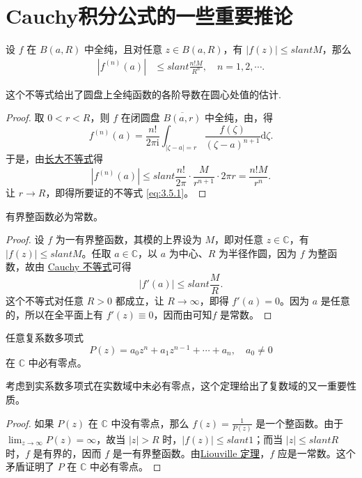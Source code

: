\documentclass[../../main.tex]{subfiles}
\begin{document}
\section{Cauchy积分公式的一些重要推论}

\begin{theorem}[Cauchy不等式]\label{theorem:Cauchy不等式-复变函数}
设 \( f \) 在 \( B(a,R) \) 中全纯，且对任意 \( z \in B(a,R) \)，有 \( |f(z)| \leqslant slant M \)，那么
\begin{align}
|f^{(n)}(a)| &\leqslant slant \frac{n!M}{R^n}, \quad n = 1,2,\cdots. \label{eq:3.5.1}
\end{align}
\end{theorem}
\begin{note}
这个不等式给出了圆盘上全纯函数的各阶导数在圆心处值的估计.
\end{note}
\begin{proof}
取 \( 0 < r < R \)，则 \( f \) 在闭圆盘 \( \overline{B(a,r)} \) 中全纯，由，得
\[
f^{(n)}(a) = \frac{n!}{2\pi \mathrm{i}} \int_{|\zeta - a| = r} \frac{f(\zeta)}{(\zeta - a)^{n + 1}} \mathrm{d}\zeta.
\]
于是，由\hyperref[proposition:长大不等式]{长大不等式}得
\[
|f^{(n)}(a)| \leqslant slant \frac{n!}{2\pi} \cdot \frac{M}{r^{n + 1}} \cdot 2\pi r = \frac{n!M}{r^n}.
\]
让 \( r \to R \)，即得所要证的不等式 \eqref{eq:3.5.1}。
\end{proof}

\begin{theorem}[Liouville定理]\label{theorem:Liouville(刘维尔)定理}
有界整函数必为常数。
\end{theorem}
\begin{proof}
设 \( f \) 为一有界整函数，其模的上界设为 \( M \)，即对任意 \( z \in \mathbb{C} \)，有 \( |f(z)| \leqslant slant M \)。任取 \( a \in \mathbb{C} \)，以 \( a \) 为中心、\( R \) 为半径作圆，因为 \( f \) 为整函数，故由 \hyperref[theorem:Cauchy不等式-复变函数]{Cauchy 不等式}可得
\[
|f'(a)| \leqslant slant \frac{M}{R}.
\]
这个不等式对任意 \( R > 0 \) 都成立，让 \( R \to \infty \)，即得 \( f'(a) = 0 \)。因为 \( a \) 是任意的，所以在全平面上有 \( f'(z) \equiv 0 \)，因而由可知\( f \) 是常数。
\end{proof}

\begin{theorem}[代数学基本定理]\label{theorem:代数学基本定理}
任意复系数多项式
\[
P(z) = a_0 z^n + a_1 z^{n - 1} + \cdots + a_n, \quad a_0 \neq 0
\]
在 \( \mathbb{C} \) 中必有零点。
\end{theorem}
\begin{note}
考虑到实系数多项式在实数域中未必有零点，这个定理给出了复数域的又一重要性质。
\end{note}
\begin{proof}
如果 \( P(z) \) 在 \( \mathbb{C} \) 中没有零点，那么 \( f(z) = \frac{1}{P(z)} \) 是一个整函数。由于 \( \lim_{z \to \infty} P(z) = \infty \)，故当 \( |z| > R \) 时，\( |f(z)| \leqslant slant 1 \)；而当 \( |z| \leqslant slant R \) 时，\( f \) 是有界的，因而 \( f \) 是一有界整函数。由\hyperref[theorem:Liouville(刘维尔)定理]{Liouville 定理}，\( f \) 应是一常数。这个矛盾证明了 \( P \) 在 \( \mathbb{C} \) 中必有零点。
\end{proof}
\end{document}
